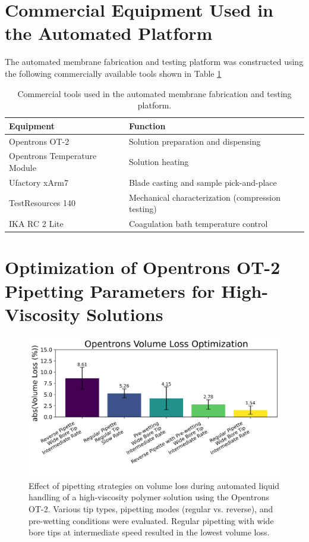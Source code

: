 \documentclass[preprint,12pt]{elsarticle}
\begin{document}
\section{Commercial Equipment Used in the Automated Platform}
The automated membrane fabrication and testing platform was constructed using the following commercially available tools shown in Table \ref{list of machines}

\begin{table}[!ht]
\centering
\begin{tabular}{ll}
\hline
\textbf{Equipment} & \textbf{Function} \\
\hline
Opentrons OT-2 & Solution preparation and dispensing \\
Opentrons Temperature Module & Solution heating \\
Ufactory xArm7 & Blade casting and sample pick-and-place \\
TestResources 140 & Mechanical characterization (compression testing) \\
IKA RC 2 Lite & Coagulation bath temperature control \\
\hline
\end{tabular}
\caption{Commercial tools used in the automated membrane fabrication and testing platform.}
\label{list of machines}
\end{table}


\section{Optimization of Opentrons OT-2 Pipetting Parameters for High-Viscosity Solutions}
\begin{figure}[h]
\centering
\includegraphics[width=0.6\linewidth]{opentrons.png}
\caption{Effect of pipetting strategies on volume loss during automated liquid handling of a high-viscosity polymer solution using the Opentrons OT-2. Various tip types, pipetting modes (regular vs. reverse), and pre-wetting conditions were evaluated. Regular pipetting with wide bore tips at intermediate speed resulted in the lowest volume loss.}
\label{opentrons.png}
\end{figure}
\clearpage
\end{document}

